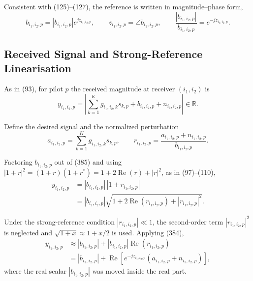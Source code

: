 \documentclass[12pt,a4paper]{article}
\begin{document}
Consistent with (125)--(127), the reference is written in
magnitude--phase form,
\begin{equation}
 b_{i_1,i_2,p}=|b_{i_1,i_2,p}|e^{jz_{i_1,i_2,p}},
 \qquad
 z_{i_1,i_2,p}=\angle b_{i_1,i_2,p},
 \qquad
 \frac{|b_{i_1,i_2,p}|}{b_{i_1,i_2,p}}=e^{-jz_{i_1,i_2,p}}.
\tag{384}
\end{equation}

\subsection{Received Signal and Strong-Reference Linearisation}

As in (93), for pilot $p$ the received magnitude at receiver
$(i_1,i_2)$ is
\begin{equation}
 y_{i_1,i_2,p}
 =
 \left|
 \sum_{k=1}^{K}g_{i_1,i_2,k}s_{k,p}
 +b_{i_1,i_2,p}
 +n_{i_1,i_2,p}
 \right|
 \in\mathbb R.
\tag{385}
\end{equation}

Define the desired signal and the normalized perturbation
\begin{equation}
 a_{i_1,i_2,p}
 =
 \sum_{k=1}^{K}g_{i_1,i_2,k}s_{k,p},
 \qquad
 r_{i_1,i_2,p}
 =
 \frac{a_{i_1,i_2,p}+n_{i_1,i_2,p}}
 {b_{i_1,i_2,p}}.
\tag{386}
\end{equation}

Factoring $b_{i_1,i_2,p}$ out of (385) and using
$|1+r|^2=(1+r)(1+r^*)=1+2\operatorname{Re}(r)+|r|^2$, as in
(97)--(110),
\begin{equation}
\begin{aligned}
y_{i_1,i_2,p}
&=
|b_{i_1,i_2,p}|\,|1+r_{i_1,i_2,p}|\\
&=
|b_{i_1,i_2,p}|
\sqrt{
1+2\operatorname{Re}(r_{i_1,i_2,p})
+|r_{i_1,i_2,p}|^2
}.
\end{aligned}
\tag{387}
\end{equation}

Under the strong-reference condition $|r_{i_1,i_2,p}|\ll1$, the
second-order term $|r_{i_1,i_2,p}|^2$ is neglected and
$\sqrt{1+x}\approx1+x/2$ is used. Applying (384),
\begin{equation}
\begin{aligned}
y_{i_1,i_2,p}
&\approx
|b_{i_1,i_2,p}|
+|b_{i_1,i_2,p}|\operatorname{Re}(r_{i_1,i_2,p})\\
&=
|b_{i_1,i_2,p}|
+\operatorname{Re}\!\left[
 e^{-jz_{i_1,i_2,p}}
 \left(a_{i_1,i_2,p}+n_{i_1,i_2,p}\right)
\right],
\end{aligned}
\tag{388}
\end{equation}
where the real scalar $|b_{i_1,i_2,p}|$ was moved inside the real part.
\end{document}
